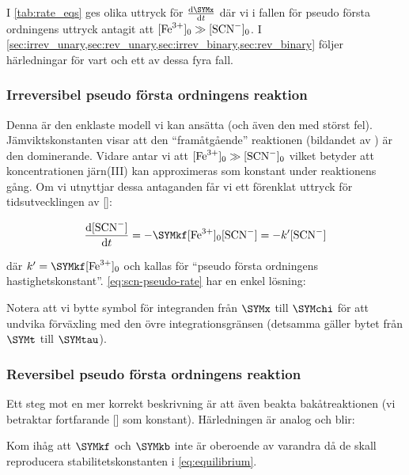 

I \cref{tab:rate_eqs} ges olika uttryck för $\frac{\mathrm{d}\SYMx}{\mathrm{d}t}$ där vi i
fallen för pseudo första ordningens uttryck antagit att $[\ce{Fe^3+}]_0
\gg [\ce{SCN-}]_0$. I
\cref{sec:irrev_unary,sec:rev_unary,sec:irrev_binary,sec:rev_binary}
följer härledningar för vart och ett av dessa fyra fall.


\subsubsection{Irreversibel pseudo första ordningens reaktion}
\label{sec:irrev_unary}
Denna är den enklaste modell vi kan ansätta (och även den med störst fel).
Jämviktskonstanten visar att den ``framåtgående'' reaktionen (bildandet av )
är den dominerande. Vidare antar vi att $[\ce{Fe^3+}]_0 \gg [\ce{SCN-}]_0$ vilket
betyder att koncentrationen järn(III) kan approximeras som konstant under
reaktionens gång. Om vi utnyttjar dessa antaganden får vi ett förenklat
uttryck för tidsutvecklingen av []:

\begin{equation}
  \label{eq:scn-pseudo-rate}
  \frac{\mathrm{d}[\ce{SCN-}]}{\mathrm{d}t} = -\SYMkf[\ce{Fe^3+}]_0[\ce{SCN-}] = -k'[\ce{SCN-}]
\end{equation}

där $k' = \SYMkf[\ce{Fe^3+}]_0$ och kallas för ``pseudo första ordningens
hastighetskonstant''. \cref{eq:scn-pseudo-rate} har en enkel lösning:



Notera att vi bytte symbol för integranden från $\SYMx$ till $\SYMchi$ för att
undvika förväxling med den övre integrationsgränsen (detsamma gäller
bytet från $\SYMt$ till $\SYMtau$).

\subsubsection{Reversibel pseudo första ordningens reaktion}
\label{sec:rev_unary}
Ett steg mot en mer korrekt beskrivning är att även beakta
bakåtreaktionen (vi betraktar fortfarande [] som
konstant). Härledningen är analog och blir:


Kom ihåg att $\SYMkf$ och $\SYMkb$ inte är oberoende av varandra då de skall reproducera
stabilitetskonstanten i \cref{eq:equilibrium}.

